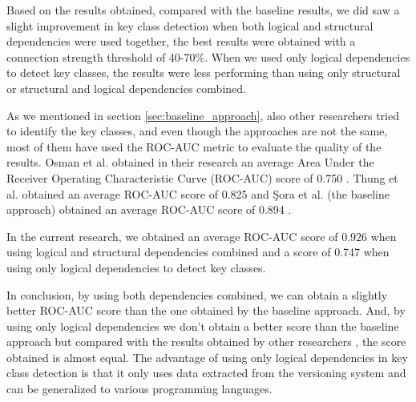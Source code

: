\documentclass[runningheads]{comsis2}
\begin{document}
Based on the results obtained, compared with the baseline results, we did saw a slight improvement in key class detection when both logical and structural dependencies were used together, the best results were obtained with a connection strength threshold of 40-70\%. When we used only logical dependencies to detect key classes, the results were less performing than using only structural or structural and logical dependencies combined.

As we mentioned in section \ref{sec:baseline_approach}, also other researchers tried to identify the key classes, and even though the approaches are not the same, most of them have used the ROC-AUC metric to evaluate the quality of the results. 
Osman et al. obtained in their research an average Area Under the Receiver Operating Characteristic Curve (ROC-AUC) score of 0.750 \cite{6676885}. Thung et al. obtained an average ROC-AUC score of 0.825 \cite{rocclasification}  and Şora et al. (the baseline approach) obtained an average ROC-AUC score of 0.894 \cite{Finding-key-classes}.

In the current research, we obtained an average ROC-AUC score of 0.926 when using logical and structural dependencies combined and a score of 0.747 when using only logical dependencies to detect key classes.

In conclusion, by using both dependencies combined, we can obtain a slightly better ROC-AUC score than the one obtained by the baseline approach. And, by using only logical dependencies we don't obtain a better score than the baseline approach but compared with the results obtained by other researchers \cite{6676885}, the score obtained is almost equal. The advantage of using only logical dependencies in key class detection is that it only uses data extracted from the versioning system and can be generalized to various programming languages.









%
%

\end{document}
